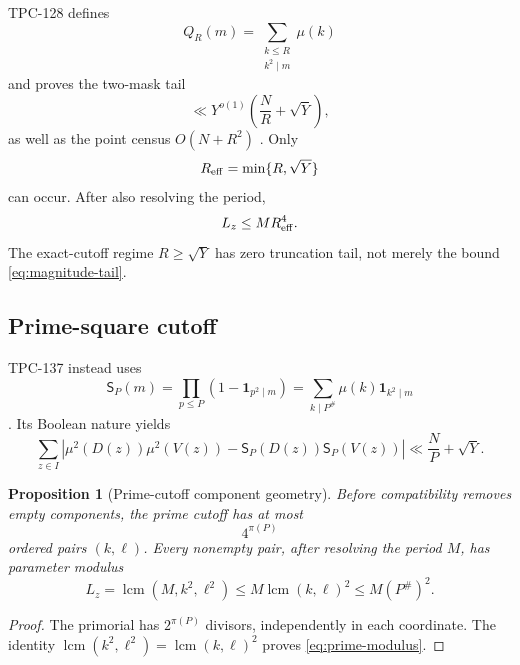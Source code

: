 \documentclass[11pt]{article}
\newtheorem{proposition}[theorem]{Proposition}
\theoremstyle{definition}
\theoremstyle{remark}
\newcommand{\one}{\mathbf 1}
\begin{document}
TPC-128 defines
\[
 Q_R(m)=\sum_{\substack{k\le R\\k^2\mid m}}\mu(k)
\]
and proves the two-mask tail
\begin{equation}
 \ll Y^{o(1)}\left(\frac NR+\sqrt Y\right),
\label{eq:magnitude-tail}
\end{equation}
as well as the point census \(O(N+R^2)\)
\citep{WangTPC128}.  Only
\[
 R_{\rm eff}=\min\{R,\sqrt Y\}
\]
can occur.  After also resolving the period,
\begin{equation}
 L_z\le MR_{\rm eff}^4.
\label{eq:magnitude-modulus}
\end{equation}
The exact-cutoff regime \(R\ge\sqrt Y\) has zero truncation tail,
not merely the bound \eqref{eq:magnitude-tail}.

\subsection{Prime-square cutoff}

TPC-137 instead uses
\[
 \mathsf S_P(m)
 =
 \prod_{p\le P}(1-\one_{p^2\mid m})
 =
 \sum_{k\mid P^\#}\mu(k)\one_{k^2\mid m}
\]
\citep{WangTPC137}.  Its Boolean nature yields
\begin{equation}
 \sum_{z\in I}
 \left|
 \mu^2(D(z))\mu^2(V(z))
 -\mathsf S_P(D(z))\mathsf S_P(V(z))
 \right|
 \ll\frac NP+\sqrt Y.
\label{eq:prime-tail}
\end{equation}

\begin{proposition}[Prime-cutoff component geometry]
\label{prop:prime-geometry}
Before compatibility removes empty components, the prime cutoff has
at most
\begin{equation}
 4^{\pi(P)}
\label{eq:pair-count}
\end{equation}
ordered pairs \((k,\ell)\).  Every nonempty pair, after resolving
the period \(M\), has parameter modulus
\begin{equation}
 L_z
 =
 \operatorname{lcm}(M,k^2,\ell^2)
 \le
 M\operatorname{lcm}(k,\ell)^2
 \le M(P^\#)^2.
\label{eq:prime-modulus}
\end{equation}
\end{proposition}

\begin{proof}
The primorial has \(2^{\pi(P)}\) divisors, independently in each
coordinate.  The identity
\(\operatorname{lcm}(k^2,\ell^2)
=\operatorname{lcm}(k,\ell)^2\) proves
\eqref{eq:prime-modulus}.
\end{proof}
\end{document}
